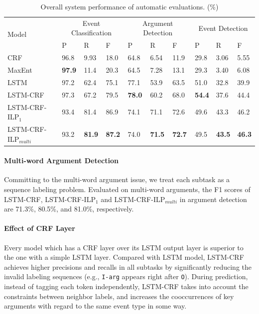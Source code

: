\begin{table}[!t]
\centering
\small
\begin{tabular}{|l|p{0.8cm}<{\centering}|p{0.8cm}<{\centering}|p{0.8cm}<{\centering}|p{0.8cm}<{\centering}|p{0.8cm}<{\centering}|p{0.8cm}<{\centering}|p{0.8cm}<{\centering}|p{0.8cm}<{\centering}|p{0.8cm}<{\centering}|} \hline
	\multirow{2}{*}{Model} & \multicolumn{3}{c|}{Event Classification} & \multicolumn{3}{c|}{Argument Detection} &
	\multicolumn{3}{c|}{Event Detection} \\ \cline{2-10}
	 & P & R & F & P & R & F & P & R & F \\ \hline
	CRF & 96.8 & 9.93 & 18.0 & 64.8 & 6.54 & 11.9 & 29.8 & 3.06 & 5.55 \\ \hline
	MaxEnt & \textbf{97.9} & 11.4 & 20.3 & 64.5 & 7.28 & 13.1 & 29.3 & 3.40 & 6.08 \\ \hline
	LSTM & 97.2 & 62.4 & 75.1 & 77.1 & 53.9 & 63.5 & 51.0 & 32.8 & 39.9  \\ \hline \hline
	LSTM-CRF & 97.3 & 67.2 & 79.5 & \textbf{78.0} & 60.2 & 68.0  & \textbf{54.4} & 37.6 & 44.4  \\ \hline
	LSTM-CRF-ILP$_{1}$ & 93.4 & 81.4 & 86.9 & 74.1 & 71.1 & 72.6  & 49.6 & 43.3 & 46.2 \\ \hline
	LSTM-CRF-ILP$_{multi}$ & 93.2 & \textbf{81.9} & \textbf{87.2} &  74.0 & \textbf{71.5} & \textbf{72.7} & 49.5 & \textbf{43.5} & \textbf{46.3} \\ \hline
\end{tabular}
\caption{Overall system performance of automatic evaluations. (\%) \label{tab:1}}
\end{table}

\paragraph{Multi-word Argument Detection}
Committing to the multi-word argument issue, we treat each subtask as a sequence labeling problem. Evaluated on multi-word arguments, the F1 scores of LSTM-CRF, LSTM-CRF-ILP$_1$ and LSTM-CRF-ILP$_{multi}$ in argument detection are 71.3\%, 80.5\%, and 81.0\%, respectively. 

\paragraph{Effect of CRF Layer} 
Every model which has a CRF layer over its LSTM output layer is superior to the one with a simple LSTM layer. Compared with LSTM model, LSTM-CRF achieves higher precisions and recalls in all subtasks by significantly reducing the invalid labeling sequences (e.g., \texttt{I-arg} appears right after \texttt{O}). During prediction, instead of tagging each token independently, LSTM-CRF takes into account the constraints between neighbor labels, and increases the cooccurrences of key arguments with regard to the same event type in some way. 

